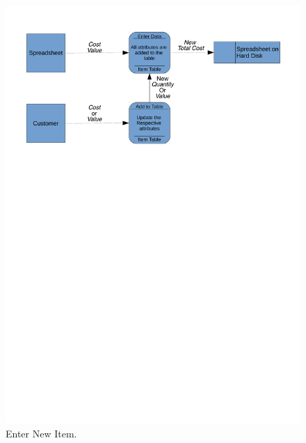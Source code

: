 \begin{figure}[H]
    \caption{Enter New Item.} \label{fig:print_function_result}
    \includegraphics[width=\textwidth]{./Analysis/Dataflow/New_System/Data_flow_new.pdf}
\end{figure}

